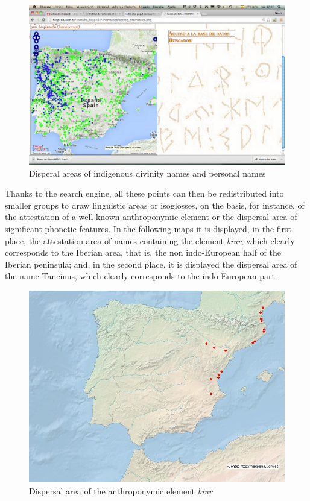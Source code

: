 \documentclass[amsthm,ebook]{saparticle}
\begin{document}
\begin{figure}[!bp]
\centering
 \includegraphics[width=\columnwidth]{EpigraphyandonomasticsinHesperiadatabanktemplate-img007.png}
\caption{Disperal areas of indigenous divinity names and personal names}
\label{fig:7}
\end{figure}
 

Thanks to the search engine, all these points can then be redistributed into smaller groups to draw linguistic areas or
isoglosses, on the basis, for instance, of the attestation of a well-known anthroponymic element or the dispersal area
of significant phonetic features. In the following maps it is displayed, in the first place, the attestation area of
names containing the element \emph{biur}, which clearly corresponds to the Iberian area, that is, the non indo-European half
of the Iberian peninsula; and, in the second place, it is displayed the dispersal area of the name Tancinus, which
clearly corresponds to the indo-European part.

\begin{figure}[!bp]
\centering
 \includegraphics[width=\columnwidth]{EpigraphyandonomasticsinHesperiadatabanktemplate-img008.jpg}
\caption{Dispersal area of the anthroponymic element \emph{biur}}
\label{fig:}
\end{figure}
\end{document}

